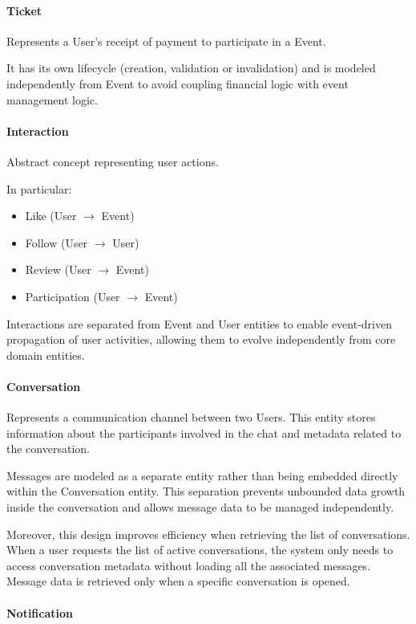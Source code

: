 \paragraph{Ticket}
Represents a User's receipt of payment to participate in a Event.

It has its own lifecycle (creation, validation or invalidation) and is modeled independently from Event to avoid coupling financial logic with event management logic.

\paragraph{Interaction}

Abstract concept representing user actions.

In particular:
\begin{itemize}
  \item Like (User $\to$ Event)
  \item Follow (User $\to$ User)
  \item Review (User $\to$ Event)
  \item Participation (User $\to$ Event)
\end{itemize}

Interactions are separated from Event and User entities to enable event-driven propagation of user activities, allowing them to evolve independently from core domain entities.

\paragraph{Conversation}

Represents a communication channel between two Users. This entity stores information about the participants involved in the chat and metadata related to the conversation.

Messages are modeled as a separate entity rather than being embedded directly within the Conversation entity. This separation prevents unbounded data growth inside the conversation and allows message data to be managed independently.

Moreover, this design improves efficiency when retrieving the list of conversations. When a user requests the list of active conversations, the system only needs to access conversation metadata without loading all the associated messages. Message data is retrieved only when a specific conversation is opened.

\paragraph{Notification}

